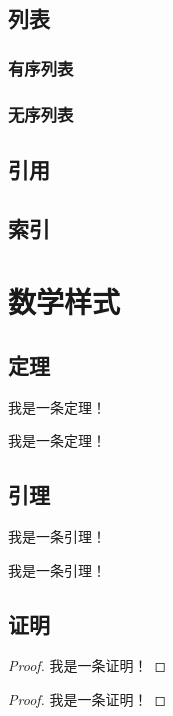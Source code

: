 \subsection{列表}
    \subsubsection{有序列表}
    \subsubsection{无序列表}
\subsection{引用}
\subsection{索引}
\clearpage
\section[数学样式]{数学样式}
\subsection{定理}
    \begin{theorem}
        我是一条定理！
    \end{theorem}
    \begin{theorem}
        我是一条定理！
    \end{theorem}
\subsection{引理}
    \begin{lemma}
        我是一条引理！
    \end{lemma}
    \begin{lemma}
        我是一条引理！
    \end{lemma}
\subsection{证明}
    \begin{proof}
        我是一条证明！
    \end{proof}
    \begin{proof}
        我是一条证明！
    \end{proof}

